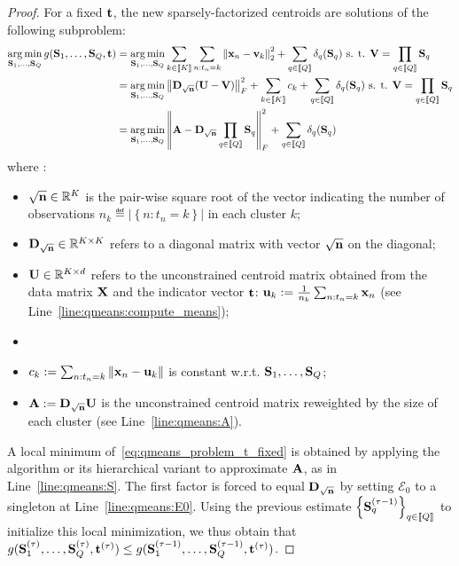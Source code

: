 \begin{proof}
For a fixed ${\mathbf{t}}$, the new sparsely-factorized centroids are solutions of the following subproblem:
%
\begin{align}
 \operatorname*{arg\,min}_{{\mathbf{S}}_1, \ldots,{\mathbf{S}}_Q} g({\mathbf{S}}_1, \ldots,{\mathbf{S}}_Q, {\mathbf{t}}) 
 & = \operatorname*{arg\,min}_{{\mathbf{S}}_1, \ldots,{\mathbf{S}}_Q} \sum_{k\in\left \llbracket K\right \rrbracket}  \sum_{n: t_n = k} \left \| {\mathbf{x}}_n - {\mathbf{v}}_k\right \|^2_2 + \sum_{q\in\left \llbracket Q\right \rrbracket} \delta_q({\mathbf{S}}_q) 
 \text{ s. t. } {\mathbf{V}} = \prod_{q\in\left \llbracket Q\right \rrbracket}{{\mathbf{S}}_q} \nonumber \\
 & = \operatorname*{arg\,min}_{{\mathbf{S}}_1, \ldots,{\mathbf{S}}_Q} \left \| {\mathbf{D}}_{\sqrt{{\mathbf{n}}}} ({\mathbf{U}} - {\mathbf{V}})\right \|_F^2
 + \sum_{k\in\left \llbracket K\right \rrbracket} c_k + \sum_{q\in\left \llbracket Q\right \rrbracket} \delta_q({\mathbf{S}}_q)
 \text{ s. t. } {\mathbf{V}} = \prod_{q\in\left \llbracket Q\right \rrbracket}{{\mathbf{S}}_q} \nonumber\\
  & = \operatorname*{arg\,min}_{{\mathbf{S}}_1, \ldots,{\mathbf{S}}_Q} \left \| {\mathbf{A}} - {\mathbf{D}}_{\sqrt{{\mathbf{n}}}} \prod_{q\in\left \llbracket Q\right \rrbracket}{{\mathbf{S}}_q}\right \|_F^2
 + \sum_{q\in\left \llbracket Q\right \rrbracket} \delta_q({\mathbf{S}}_q)
 \label{eq:qmeans_problem_t_fixed}
\end{align}
%
where :
%
\begin{itemize}
 \item $\sqrt{{\mathbf{n}}} \in \mathbb{R}^{K}$ is the pair-wise square root of the vector indicating the number of observations $n_k \eqdef \left | \left \lbrace n: t_n = k\right \rbrace \right |$  in each cluster $k$;
 \item ${\mathbf{D}}_{\sqrt{{\mathbf{n}}}} \in \mathbb{R}^{K \times K}$ refers to a diagonal matrix with vector $\sqrt{{\mathbf{n}}}$ on the diagonal;
 \item ${\mathbf{U}}\in \mathbb{R}^{K \times d}$ refers to the unconstrained centroid matrix obtained from the data matrix ${\mathbf{X}}$ and the indicator vector ${\mathbf{t}}$: ${\mathbf{u}}_k := \frac{1}{n_k}\sum_{n:t_n = k} {{\mathbf{x}}_n}$ (see Line~\ref{line:qmeans:compute_means});
 \item {}
 \item $c_k := \sum_{n: t_n = k}\left \| {\mathbf{x}}_n - {\mathbf{u}}_k\right \|$ is constant w.r.t. $ {\mathbf{S}}_1, \ldots,{\mathbf{S}}_Q$;
 \item ${\mathbf{A}} := {\mathbf{D}}_{\sqrt{{\mathbf{n}}}} {\mathbf{U}}$ is the unconstrained centroid matrix reweighted by the size of each cluster (see Line~\ref{line:qmeans:A}).
\end{itemize}

A local minimum of~\eqref{eq:qmeans_problem_t_fixed} is obtained by applying the \palm algorithm or its hierarchical variant to approximate ${\mathbf{A}}$, as in Line~\ref{line:qmeans:S}. The first factor is forced to equal ${\mathbf{D}}_{\sqrt{{\mathbf{n}}}}$ by setting $\mathcal{E}_0$ to a singleton at Line~\ref{line:qmeans:E0}. Using the previous estimate $\left \lbrace {\mathbf{S}}_q^{(\tau-1)}\right \rbrace_{q\in\left \llbracket Q\right \rrbracket}$ to initialize this local minimization, we thus obtain that $g({\mathbf{S}}_1^{(\tau)}, \ldots,{\mathbf{S}}_Q^{(\tau)}, {\mathbf{t}}^{(\tau)}) \leq g({\mathbf{S}}_1^{(\tau-1)}, \ldots,{\mathbf{S}}_Q^{(\tau-1)}, {\mathbf{t}}^{(\tau)})$.


\end{proof}

